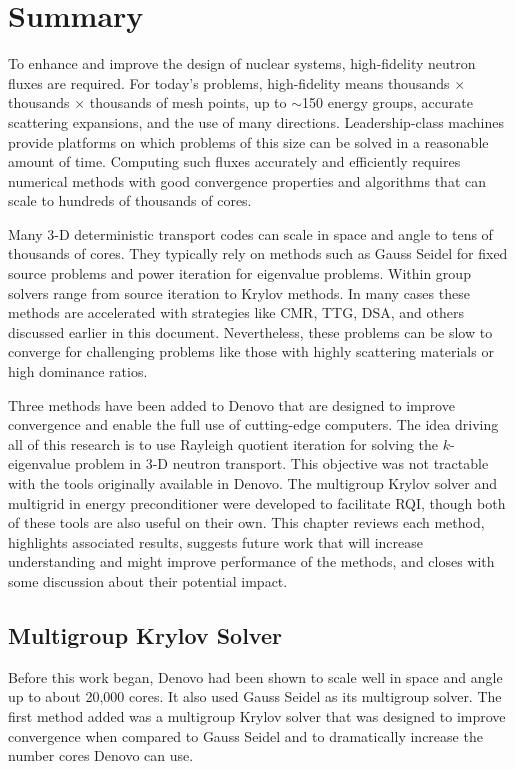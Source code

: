 
\chapter{Summary}
\label{sec:Chp5}
To enhance and improve the design of nuclear systems, high-fidelity neutron fluxes are required. For today's problems, high-fidelity means thousands $\times$ thousands $\times$ thousands of mesh points, up to $\sim$150 energy groups, accurate scattering expansions, and the use of many directions. Leadership-class machines provide platforms on which problems of this size can be solved in a reasonable amount of time. Computing such fluxes accurately and efficiently requires numerical methods with good convergence properties and algorithms that can scale to hundreds of thousands of cores. 

Many 3-D deterministic transport codes can scale in space and angle to tens of thousands of cores. They typically rely on methods such as Gauss Seidel for fixed source problems and power iteration for eigenvalue problems. Within group solvers range from source iteration to Krylov methods. In many cases these methods are accelerated with strategies like CMR, TTG, DSA, and others discussed earlier in this document. Nevertheless, these problems can be slow to converge for challenging problems like those with highly scattering materials or high dominance ratios. 

Three methods have been added to Denovo that are designed to improve convergence and enable the full use of cutting-edge computers. The idea driving all of this research is to use Rayleigh quotient iteration for solving the $k$-eigenvalue problem in 3-D neutron transport. This objective was not tractable with the tools originally available in Denovo. The multigroup Krylov solver and multigrid in energy preconditioner were developed to facilitate RQI, though both of these tools are also useful on their own. This chapter reviews each method, highlights associated results, suggests future work that will increase understanding and might improve performance of the methods, and closes with some discussion about their potential impact. 

\section{Multigroup Krylov Solver}
Before this work began, Denovo had been shown to scale well in space and angle up to about 20,000 cores. It also used Gauss Seidel as its multigroup solver. The first method added was a multigroup Krylov solver that was designed to improve convergence when compared to Gauss Seidel and to dramatically increase the number cores Denovo can use. 

